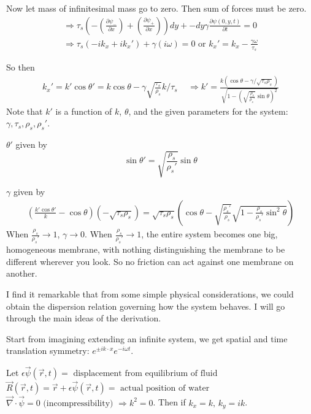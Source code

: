 \documentclass[twoside,10pt]{amsart}
\newcommand{\problemhead}[1]
  {\smallskip
   \noindent{\large\bf Problem #1.}
   \smallskip}
\begin{document}
Now let mass of infinitesimal mass go to zero.  Then sum of forces must be zero.  
\[
\begin{gathered}
  \Longrightarrow \tau_s (-\left( \frac{ \partial \psi_- }{ \partial x} \right) + \left( \frac{ \partial \psi_+ }{ \partial x } \right) ) dy + - dy \gamma \frac{ \partial \psi(0,y,t)}{ \partial t}  = 0 \\ 
  \Longrightarrow \tau_s (-i k_x + ik_x' ) + \gamma (i\omega ) = 0 \text{ or }\boxed{  k_x' = k_x - \frac{ \gamma \omega}{\tau_s} }
\end{gathered}
\]

So then 
\[
\begin{gathered}
  k_x' = k' \cos{\theta'} = k \cos{\theta} - \gamma \sqrt{ \frac{ \tau_s}{\rho_s} }k/\tau_s \quad \, \Longrightarrow \boxed{ k' = \frac{ k (\cos{\theta} - \gamma / \sqrt{ \tau_s \rho_s } ) }{ \sqrt{ 1 - \left( \sqrt{ \frac{ \rho_s}{\rho_s'} } \sin{\theta} \right)^2 } } }
\end{gathered}
\]
Note that $k'$ is a function of $k$, $\theta$, and the given parameters for the system: $\gamma, \tau_s, \rho_s, \rho_s'$.  

$\theta'$ given by
\[
\sin{\theta'} = \sqrt{ \frac{ \rho_s}{\rho_s'}} \sin{\theta}
\]

$\gamma$ given by
\[
\begin{gathered}
  \left( \frac{ k' \cos{\theta'} }{k} - \cos{\theta} \right) (-\sqrt{ \tau_s \rho_s} ) = \boxed{ \sqrt{ \tau_s \rho_s} \left( \cos{\theta} - \sqrt{ \frac{ \rho_s'}{\rho_s} } \sqrt{ 1 - \frac{ \rho_s}{\rho_s' }\sin^2{\theta} } \right) }
\end{gathered}
\]
When $\frac{\rho_s}{\rho_s'} \to 1$, $\gamma \to 0$.  When $\frac{\rho_s}{\rho_s'} \to 1$, the entire system becomes one big, homogeneous membrane, with nothing distinguishing the membrane to be different wherever you look.  So no friction can act against one membrane on another.  

\problemhead{11.10} I find it remarkable that from some simple physical considerations, we could obtain the dispersion relation governing how the system behaves.  I will go through the main ideas of the derivation.

Start from imagining extending an infinite system, we get spatial and time translation symmetry: $e^{ \pm i k\cdot x} e^{- i \omega t}$.  

Let $\epsilon \vec{\psi}(\vec{r},t) = \text{ displacement from equilibrium of fluid}$ \\
\phantom{Let }$\vec{R}(\vec{r},t) = \vec{r} + \epsilon \vec{\psi}(\vec{r},t) = \text{ actual position of water }$
\phantom{Let }$\vec{\nabla}\cdot \vec{\psi} = 0 \text{ (incompressibility) } \Longrightarrow k^2 = 0$.  Then if $k_x = k, \, k_y = ik$.  
\end{document}
